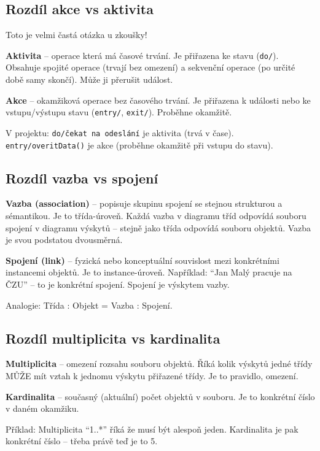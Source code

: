 \documentclass[12pt, a4paper]{article}
\begin{document}
\subsection{Rozdíl akce vs aktivita}

Toto je velmi častá otázka u zkoušky!

\textbf{Aktivita} -- operace která má časové trvání. Je přiřazena ke stavu (\texttt{do/}). Obsahuje spojité operace (trvají bez omezení) a sekvenční operace (po určité době samy skončí). Může ji přerušit událost.

\textbf{Akce} -- okamžiková operace bez časového trvání. Je přiřazena k události nebo ke vstupu/výstupu stavu (\texttt{entry/}, \texttt{exit/}). Proběhne okamžitě.

V projektu: \texttt{do/čekat na odeslání} je aktivita (trvá v čase). \texttt{entry/overitData()} je akce (proběhne okamžitě při vstupu do stavu).

\subsection{Rozdíl vazba vs spojení}

\textbf{Vazba (association)} -- popisuje skupinu spojení se stejnou strukturou a sémantikou. Je to třída-úroveň. Každá vazba v diagramu tříd odpovídá souboru spojení v diagramu výskytů -- stejně jako třída odpovídá souboru objektů. Vazba je svou podstatou dvousměrná.

\textbf{Spojení (link)} -- fyzická nebo konceptuální souvislost mezi konkrétními instancemi objektů. Je to instance-úroveň. Například: ``Jan Malý pracuje na ČZU'' -- to je konkrétní spojení. Spojení je výskytem vazby.

Analogie: Třída : Objekt = Vazba : Spojení.

\subsection{Rozdíl multiplicita vs kardinalita}

\textbf{Multiplicita} -- omezení rozsahu souboru objektů. Říká kolik výskytů jedné třídy MŮŽE mít vztah k jednomu výskytu přiřazené třídy. Je to pravidlo, omezení.

\textbf{Kardinalita} -- současný (aktuální) počet objektů v souboru. Je to konkrétní číslo v daném okamžiku.

Příklad: Multiplicita ``1..*'' říká že musí být alespoň jeden. Kardinalita je pak konkrétní číslo -- třeba právě teď je to 5.
\end{document}
